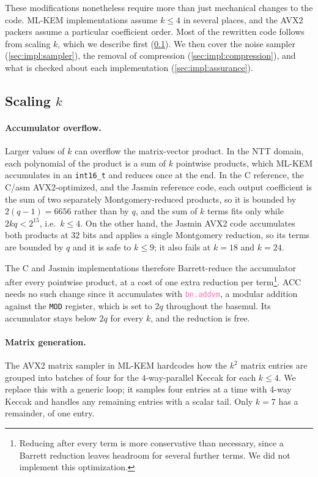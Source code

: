 These modifications nonetheless require more than just mechanical changes to the code. ML-KEM
implementations assume $k \le 4$ in several places, and the AVX2 packers
assume a particular coefficient order. Most of the rewritten code follows from
scaling $k$, which we describe first (\cref{sec:impl:k}). We then cover
the noise sampler (\cref{sec:impl:sampler}), the removal of compression
(\cref{sec:impl:compression}), and what is checked about each
implementation (\cref{sec:impl:assurance}).

\subsection{Scaling $k$}
\label{sec:impl:k}

\paragraph{Accumulator overflow.}
Larger values of $k$ can overflow the matrix-vector product. In the NTT domain, each polynomial of the 
product is a sum of $k$ pointwise products, which
ML-KEM accumulates in an \texttt{int16\_t} and reduces once at the end. In the C reference, the 
C/asm AVX2-optimized, and the Jasmin reference code, each output coefficient is the sum of two separately
Montgomery-reduced products, so it is bounded by $2(q-1) = 6656$ rather than by
$q$, and the sum of $k$ terms fits only while $2kq < 2^{15}$, i.e.\ $k \le 4$. On the other hand, the Jasmin AVX2 code accumulates 
both products at $32$ bits and applies a single Montgomery reduction, so its terms are bounded by $q$ and it is safe to
$k \le 9$; it also fails at $k=18$ and $k=24$.

The C and Jasmin implementations therefore Barrett-reduce the accumulator after every pointwise product, at 
a cost of one extra reduction per term\footnote{Reducing after every term is more conservative than
necessary, since a Barrett reduction leaves headroom for several further terms. We did not implement this optimization.}.
ACC needs no such change since it accumulates with \textcolor{hotpink}{\texttt{bn.addvm}},
a modular addition against the \texttt{MOD} register, which is set to $2q$ throughout the basemul. Its accumulator
stays below $2q$ for every $k$, and the reduction is free.

\paragraph{Matrix generation.}
The AVX2 matrix sampler in ML-KEM hardcodes how the $k^2$
matrix entries are grouped into batches of four for the $4$-way-parallel Keccak for each $k \le 4$. We
replace this with a generic loop; it samples four entries at a time with 4-way Keccak and handles 
any remaining entries with a scalar tail. Only $k=7$ has a
remainder, of one entry.

